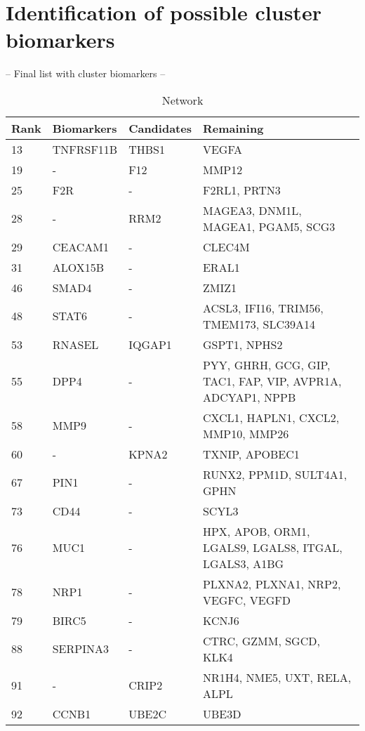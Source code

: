 \section{Identification of possible cluster biomarkers}
-- Final list with cluster biomarkers --
\begin{table}
    \begin{tabular}{|p{1cm}|p{3cm}|p{3cm}|p{4cm}|}
        \hline
        \textbf{Rank} & \textbf{Biomarkers} & \textbf{Candidates} & \textbf{Remaining} \\
        \hline
        13	& TNFRSF11B	& THBS1	& VEGFA \\
        \hline
        19	& -	& F12	& MMP12 \\
        \hline
        25	& F2R	& -	& F2RL1, PRTN3 \\
        \hline
        28	& -	& RRM2	& MAGEA3, DNM1L, MAGEA1, PGAM5, SCG3 \\
        \hline
        29	& CEACAM1	& -	& CLEC4M \\
        \hline
        31	& ALOX15B	& -	& ERAL1 \\
        \hline
        46	& SMAD4	& -	& ZMIZ1 \\
        \hline
        48	& STAT6	& -	& ACSL3, IFI16, TRIM56, TMEM173, SLC39A14 \\
        \hline
        53	& RNASEL	& IQGAP1	& GSPT1, NPHS2 \\
        \hline
        55	& DPP4	& -	& PYY, GHRH, GCG, GIP, TAC1, FAP, VIP, AVPR1A, ADCYAP1, NPPB \\
        \hline
        58	& MMP9	& -	& CXCL1, HAPLN1, CXCL2, MMP10, MMP26 \\
        \hline
        60	& -	& KPNA2	& TXNIP, APOBEC1 \\
        \hline
        67	& PIN1	& -	& RUNX2, PPM1D, SULT4A1, GPHN \\
        \hline
        73	& CD44	& -	& SCYL3 \\
        \hline
        76	& MUC1	& -	& HPX, APOB, ORM1, LGALS9, LGALS8, ITGAL, LGALS3, A1BG \\
        \hline
        78	& NRP1	& -	& PLXNA2, PLXNA1, NRP2, VEGFC, VEGFD \\
        \hline
        79	& BIRC5	& -	& KCNJ6 \\
        \hline
        88	& SERPINA3	& -	& CTRC, GZMM, SGCD, KLK4 \\
        \hline
        91	& -	& CRIP2	& NR1H4, NME5, UXT, RELA, ALPL \\
        \hline
        92	& CCNB1	& UBE2C	& UBE3D \\
        \hline
    \end{tabular}
    \caption{Network }
    \label{tab:prwp-movember}
\end{table}
